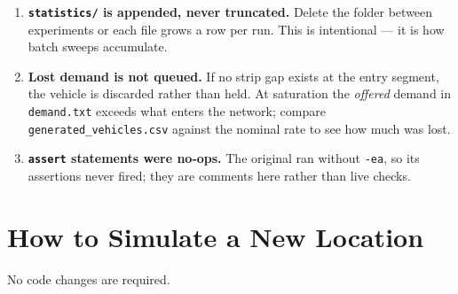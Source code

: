 \documentclass[11pt, a4paper]{article}
\newcommand{\code}[1]{\texttt{#1}}
\begin{document}
\begin{enumerate}
    \item \textbf{\code{statistics/} is appended, never truncated.} Delete the
    folder between experiments or each file grows a row per run. This is
    intentional --- it is how batch sweeps accumulate.

    \item \textbf{Lost demand is not queued.} If no strip gap exists at the entry
    segment, the vehicle is discarded rather than held. At saturation the
    \emph{offered} demand in \code{demand.txt} exceeds what enters the network;
    compare \code{generated\_vehicles.csv} against the nominal rate to see how
    much was lost.

    \item \textbf{\code{assert} statements were no-ops.} The original ran without
    \code{-ea}, so its assertions never fired; they are comments here rather than
    live checks.
\end{enumerate}

\section{How to Simulate a New Location}

No code changes are required.
\end{document}
